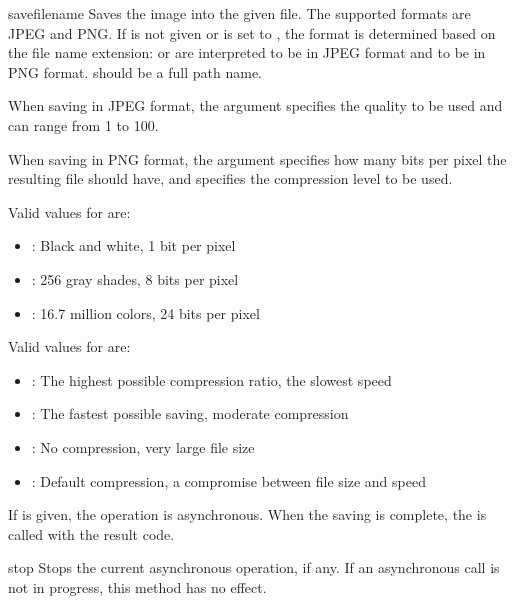 \begin{methoddesc}[Image]{save}{filename}
Saves the image into the given file. The supported formats are JPEG and PNG. 
If  is not given or is set to , the format is 
determined based on the file name extension:  or 
 are interpreted to be in JPEG format and  to 
be in PNG format.  should be a full path name.

When saving in JPEG format, the  argument specifies the 
quality to be used and can range from 1 to 100. 

When saving in PNG format, the  argument specifies how many bits 
per pixel the resulting file should have, and  specifies 
the compression level to be used. 

Valid values for  are:

\begin{itemize}
\item {}: Black and white, 1 bit per pixel
\item {}: 256 gray shades, 8 bits per pixel
\item {}: 16.7 million colors, 24 bits per pixel
\end{itemize}

Valid values for  are:

\begin{itemize}
\item {}: The highest possible compression ratio, the slowest speed
\item {}: The fastest possible saving, moderate compression
\item {}: No compression, very large file size
\item {}: Default compression, a compromise between file size and speed 
\end{itemize}

If  is given, the operation is asynchronous. When the 
saving is complete, the  is called with the result code.
\end{methoddesc}


\begin{methoddesc}[Image]{stop}{}
Stops the current asynchronous operation, if any. If an asynchronous call is 
not in progress, this method has no effect.
\end{methoddesc}

